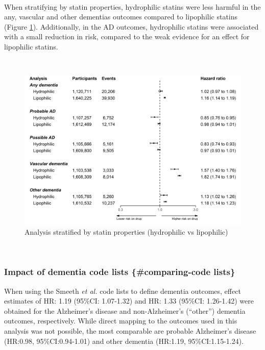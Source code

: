 \documentclass[a4paper, twoside]{templates/ociamthesis}
\begin{document}
~

When stratifying by statin properties, hydrophilic statins were less harmful in the any, vascular and other dementias outcomes compared to lipophilic statins (Figure \ref{fig:statinTypeFig}). Additionally, in the AD outcomes, hydrophilic statins were associated with a small reduction in risk, compared to the weak evidence for an effect for lipophilic statins.

~





\begin{figure}[H]
\includegraphics[width=1\linewidth]{figures/cprd-analysis/forester_sta_type} \caption[Analysis stratified by statin properties]{Analysis stratified by statin properties (hydrophilic vs lipophilic)}\label{fig:statinTypeFig}
\end{figure}

~

\hypertarget{impact-of-dementia-code-lists-comparing-code-lists}{%
\subsubsection{Impact of dementia code lists \{\#comparing-code lists\}}\label{impact-of-dementia-code-lists-comparing-code-lists}}

When using the Smeeth \emph{et al.} code lists to define dementia outcomes, effect estimates of HR: 1.19 (95\%CI: 1.07-1.32) and HR: 1.33 (95\%CI: 1.26-1.42) were obtained for the Alzheimer's disease and non-Alzheimer's (``other'') dementia outcomes, respectively. While direct mapping to the outcomes used in this analysis was not possible, the most comparable are probable Alzheimer's disease (HR:0.98, 95\%CI:0.94-1.01) and other dementia (HR:1.19, 95\%CI:1.15-1.24).
\end{document}
